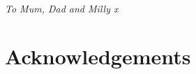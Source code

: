 \documentclass[11pt, a4paper, twosided]{book}
\newcommand{\thesisauthor}{Holly Amelia Rebecca Giles}
\newcommand{\thesisdate}{Dec 11, 2021}
\begin{document}
\newpage
\thispagestyle{empty}
%
%
%
%

\pagestyle{empty} %





\vspace*{\fill}
\begin{center}
\textit{To Mum, Dad and Milly x}
\end{center}
\vspace*{\fill}
\newpage\null\thispagestyle{empty}\newpage

\pagestyle{plain}
\setcounter{page}{1}    %
\newpage
\hypertarget{acknowledgements}{%
\chapter*{Acknowledgements}\label{acknowledgements}}
\end{document}
